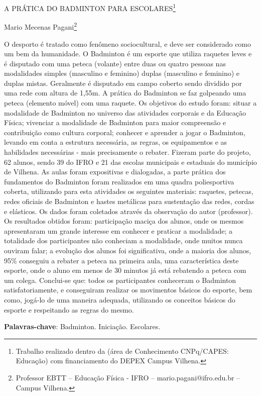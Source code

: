 \documentclass[article,12pt,onesidea,4paper,english,brazil]{abntex2}
\begin{document}
	
	
	\frenchspacing 
	
	\begin{center}
		\LARGE A PRÁTICA DO BADMINTON PARA ESCOLARES\footnote{Trabalho realizado dentro da (área de Conhecimento CNPq/CAPES: Educação) com financiamento do DEPEX Campus Vilhena.}
		
		\normalsize
		Mario Mecenas Pagani\footnote{Professor EBTT – Educação Física - IFRO – mario.pagani@ifro.edu.br – Campus Vilhena.} 
	\end{center}
	
	\noindent O desporto é tratado como fenômeno sociocultural, e deve ser considerado como um bem da humanidade. O Badminton é um esporte que utiliza raquetes leves e é disputado com uma peteca (volante) entre duas ou quatro pessoas nas modalidades simples (masculino e feminino) duplas (masculino e feminino) e duplas mistas. Geralmente é disputado em campo coberto sendo dividido por uma rede com altura de 1,55m. A prática do Badminton se faz golpeando uma peteca (elemento móvel) com uma raquete. Os objetivos do estudo foram: situar a modalidade de Badminton no universo das atividades corporais e da Educação Física; vivenciar a modalidade de Badminton para maior compreensão e contribuição como cultura corporal; conhecer e aprender a jogar o Badminton, levando em conta a estrutura necessária, as regras, os equipamentos e as habilidades necessárias - mais precisamente o rebater. Fizeram parte do projeto, 62 alunos, sendo 39 do IFRO e 21 das escolas municipais e estaduais do município de Vilhena. As aulas foram expositivas e dialogadas, a parte prática dos fundamentos do Badminton foram realizados em uma quadra poliesportiva coberta, utilizando para esta atividades os seguintes materiais: raquetes, petecas, redes oficiais de Badminton e hastes metálicas para sustentação das redes, cordas e elásticos. Os dados foram coletados através da observação do autor (professor). Os resultados obtidos foram:  participação maciça dos alunos, onde os mesmos apresentaram um grande interesse em conhecer e praticar a modalidade; a totalidade dos participantes não conheciam a modalidade, onde muitos nunca ouviram falar; a evolução dos alunos foi significativa, onde a maioria dos alunos, 95\% conseguiu a rebater a peteca na primeira aula, uma característica deste esporte, onde o aluno em menos de 30 minutos já está rebatendo a peteca com um colega. Conclui-se que: todos os participantes conheceram o Badminton satisfatoriamente, e conseguiram realizar os movimentos básicos do esporte, bem como, jogá-lo de uma maneira adequada, utilizando os conceitos básicos do esporte e respeitando as regras do mesmo.
	
	\vspace{\onelineskip}
	
	\noindent
	\textbf{Palavras-chave}: Badminton. Iniciação. Escolares.
	
\end{document}
